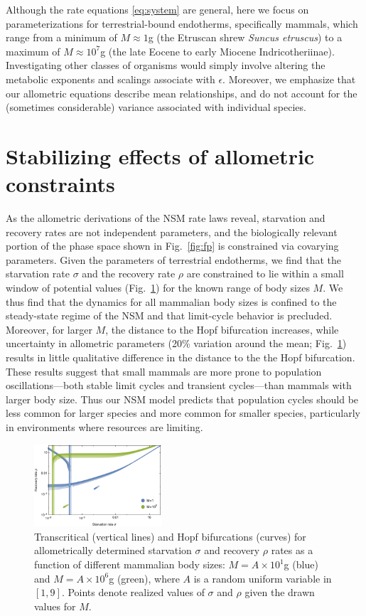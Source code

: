 \documentclass[twocolumn,preprintnumbers,amsmath,amssymb,superscriptaddress]{revtex4}
\begin{document}
Although the rate equations \eqref{eq:system} are general, here we focus on
parameterizations for terrestrial-bound endotherms, specifically mammals,
which range from a minimum of $M\approx1$g (the Etruscan shrew
\emph{Suncus etruscus}) to a maximum of $M\approx10^7$g (the late Eocene
to early Miocene Indricotheriinae).  Investigating other classes of organisms
would simply involve altering the metabolic exponents and scalings associate
with $\epsilon$. Moreover, we emphasize that our allometric equations
describe mean relationships, and do not account for the (sometimes
considerable) variance associated with individual species.


\section*{Stabilizing effects of allometric constraints}
As the allometric derivations of the NSM rate laws reveal, starvation and recovery rates are not independent parameters, and the biologically relevant portion of the phase space shown in Fig.~\ref{fig:fp} is constrained via covarying parameters.  
Given the parameters of terrestrial endotherms, we find that the starvation rate $\sigma$ and the recovery rate $\rho$ are constrained to lie within a small window of potential values (Fig.~\ref{fig:hopf}) for the known range of body sizes $M$. 
We thus find that the dynamics for all mammalian body sizes is confined to the steady-state regime of the NSM and that limit-cycle behavior is precluded.
Moreover, for larger $M$, the distance to the Hopf bifurcation increases, while uncertainty in allometric parameters (20\% variation around the mean; Fig.~\ref{fig:hopf}) results in little qualitative difference in the distance to the the Hopf bifurcation. 
These results suggest that small mammals are more prone to population oscillations---both stable limit cycles and transient cycles---than mammals with larger body size.  
Thus our NSM model predicts that population cycles should be less common for larger species and more common for smaller species, particularly in environments where resources are limiting.

\begin{figure}
\includegraphics[width=0.425\textwidth]{fig_DataHopf.pdf}
\caption{\small Transcritical (vertical lines) and Hopf bifurcations (curves) for
  allometrically determined starvation $\sigma$ and recovery $\rho$ rates as
  a function of different mammalian body sizes: $M=A\times10^1$g (blue) and
  $M=A\times10^6$g (green), where $A$ is a random uniform variable in $[1,9]$.
  Points denote realized values of $\sigma$ and $\rho$ given the drawn values for $M$.
  }
\label{fig:hopf}
\end{figure}
\end{document}
